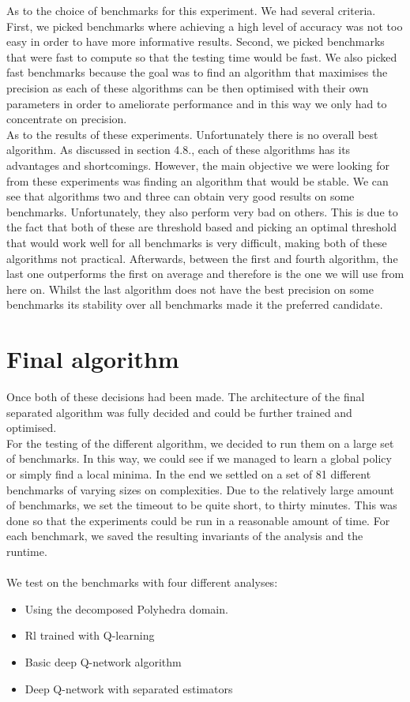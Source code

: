 As to the choice of benchmarks for this experiment. We had several criteria. First, we picked benchmarks where achieving a high level of accuracy was not too easy in order to have more informative results. Second, we picked benchmarks that were fast to compute so that the testing time would be fast. We also picked fast benchmarks because the goal was to find an algorithm that maximises the precision as each of these algorithms can be then optimised with their own parameters in order to ameliorate performance and in this way we only had to concentrate on precision.\\
As to the results of these experiments. Unfortunately there is no overall best algorithm. As discussed in section 4.8., each of these algorithms has its advantages and shortcomings. However, the main objective we were looking for from these experiments was finding an algorithm that would be stable. We can see that algorithms two and three can obtain very good results on some benchmarks. Unfortunately, they also perform very bad on others. This is due to the fact that both of these are threshold based and picking an optimal threshold that would work well for all benchmarks is very difficult, making both of these algorithms not practical. Afterwards, between the first and fourth algorithm, the last one outperforms the first on average and therefore is the one we will use from here on. Whilst the last algorithm does not have the best precision on some benchmarks its stability over all benchmarks made it the preferred candidate.


\section{Final algorithm}
Once both of these decisions had been made. The architecture of the final separated algorithm was fully decided and could be further trained and optimised.\\
For the testing of the different algorithm, we decided to run them on a large set of benchmarks. In this way, we could see if we managed to learn a global policy or simply find a local minima. In the end we settled on a set of 81 different benchmarks of varying sizes on complexities. Due to the relatively large amount of benchmarks, we set the timeout to be quite short, to thirty minutes. This was done so that the experiments could be run in a reasonable amount of time. For each benchmark, we saved the resulting invariants of the analysis and the runtime.\\
\mbox{}\\
We test on the benchmarks with four different analyses:
\begin{itemize}
	\item Using the decomposed Polyhedra domain.
	\item Rl trained with Q-learning
	\item Basic deep Q-network algorithm
	\item Deep Q-network with separated estimators
\end{itemize}

